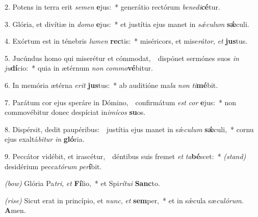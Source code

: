 2. Potens in terra erit \textit{se}\textit{men} \textbf{e}jus:~* generátio rectórum \textit{be}\textit{ne}\textit{di}\textbf{cé}tur.

3. Glória, et divítiæ in \textit{do}\textit{mo} \textbf{e}jus:~* et justítia ejus manet in \textit{s\'{\ae}}\textit{cu}\textit{lum} \textbf{s\'{\ae}}culi.

4. Exórtum est in ténebris \textit{lu}\textit{men} \textbf{rec}tis:~* miséricors, et mise\textit{rá}\textit{tor}, \textit{et} \textbf{jus}tus.

5. Jucúndus homo qui miserétur et cómmodat,~\GreDagger\ dispónet sermónes suos \textit{in} \textit{ju}\textbf{dí}cio:~* quia in ætérnum \textit{non} \textit{com}\textit{mo}\textbf{vé}bitur.

6. In memória ætérna \textit{e}\textit{rit} \textbf{jus}tus:~* ab auditióne ma\textit{la} \textit{non} \textit{ti}\textbf{mé}bit.

7. Parátum cor ejus speráre in Dómino,~\GreDagger\ confirmátum \textit{est} \textit{cor} \textbf{e}jus:~* non commovébitur donec despíciat in\textit{i}\textit{mí}\textit{cos} \textbf{su}os.

8. Dispérsit, dedit paupéribus:~\GreDagger\ justítia ejus manet in s\'{\ae}\textit{cu}\textit{lum} \textbf{s\'{\ae}}culi,~* cornu ejus exaltá\textit{bi}\textit{tur} \textit{in} \textbf{gló}ria.

9. Peccátor vidébit, et irascétur,~\GreDagger\ déntibus suis fremet \textit{et} \textit{ta}\textbf{bé}scet:~* {\color{red}\textit{(stand)}} desidérium pecca\textit{tó}\textit{rum} \textit{per}\textbf{í}bit.

{\color{red}\textit{(bow)}} Glória Pa\textit{tri}, \textit{et} \textbf{Fí}lio,~* et Spi\textit{rí}\textit{tu}\textit{i} \textbf{Sanc}to.

{\color{red}\textit{(rise)}} Sicut erat in princípio, et \textit{nunc}, \textit{et} \textbf{sem}per,~* et in s\'{\ae}cula sæ\textit{cu}\textit{ló}\textit{rum}. \textbf{A}men.